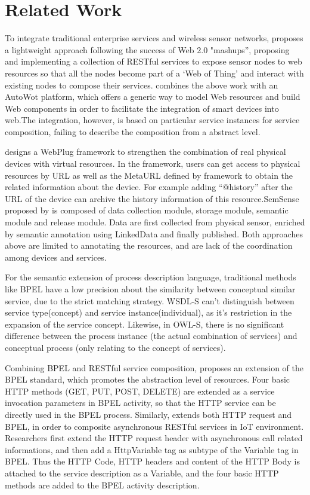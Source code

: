 \section{Related Work}
\label{Related Work}
To integrate traditional enterprise services and wireless sensor networks, \cite{guinard2009towards} proposes a lightweight approach following the success of Web 2.0 "mashups”, proposing and implementing a collection of RESTful services to expose sensor nodes to web resources so that all the nodes become part of a ‘Web of Thing’ and interact with existing nodes to compose their services. \cite{mayer2010facilitating} combines the above work with an AutoWot platform, which offers a generic way to model Web resources and build Web components in order to facilitate the integration of smart devices into web.The integration, however, is based on particular service instances for service composition, failing to describe the composition from a abstract level. 

\cite{ostermaier2010webplug} designs a WebPlug framework to strengthen the combination of real physical devices with virtual resources. In the framework, users can get access to physical resources by URL as well as the MetaURL defined by framework to obtain the related information about the device. For example adding “@history” after the URL of the device can archive the history information of this resource.SemSense proposed by \cite{moraru2011exposing} is composed of data collection module, storage module, semantic module and release module. Data are first collected from physical sensor, enriched by semantic annotation using LinkedData and finally published. Both approaches above are limited to annotating the resources, and are lack of the coordination among devices and services. 

For the semantic extension of process description language, traditional methods like BPEL have a low precision about the similarity between conceptual similar service, due to the strict matching strategy\cite{nitzsche2007ontology}. WSDL-S\cite{WSDLS} can't distinguish between service type(concept) and service instance(individual), as it's restriction in the expansion of the service concept. Likewise, in OWL-S\cite{OWLS}, there is no significant difference between the process instance (the actual combination of services) and conceptual process (only relating to the concept of services). 

Combining BPEL and RESTful service composition, \cite{pautasso2009restful} proposes an extension of the BPEL standard, which promotes the abstraction level of resources. Four basic HTTP methods (GET, PUT, POST, DELETE) are extended as a service invocation parameters in BPEL activity, so that the HTTP service can be directly used in the BPEL process. Similarly, \cite{zhang2014research} extends both HTTP request and BPEL, in order to composite asynchronous RESTful services in IoT environment. Researchers first extend the HTTP request header with asynchronous call related informations, and then add a HttpVariable tag as subtype of the Variable tag in BPEL. Thus the HTTP Code, HTTP headers and content of the HTTP Body is attached to the service description as a Variable, and the four basic HTTP methods are added to the BPEL activity description. 


